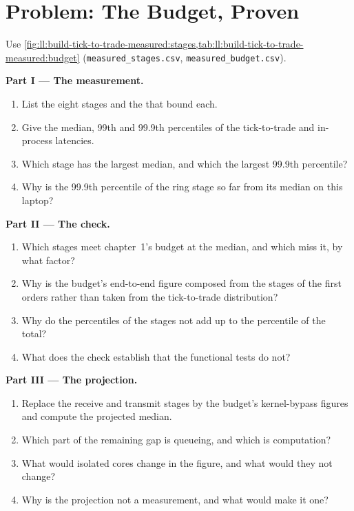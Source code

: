 \section{Problem: The Budget, Proven}

\begin{problem}\label{pb:ll:build-tick-to-trade-measured:1}
Use \cref{fig:ll:build-tick-to-trade-measured:stages,tab:ll:build-tick-to-trade-measured:budget} (\texttt{measured\_stages.csv},
\texttt{measured\_budget.csv}).

\medskip\noindent\textbf{Part I --- The measurement.}
\begin{enumerate}
\item List the eight stages and the  that bound each.
\item Give the median, 99th and 99.9th percentiles of the tick-to-trade and in-process latencies.
\item Which stage has the largest median, and which the largest 99.9th percentile?
\item Why is the 99.9th percentile of the ring stage so far from its median on this laptop?
\end{enumerate}

\medskip\noindent\textbf{Part II --- The check.}
\begin{enumerate}[resume]
\item Which stages meet chapter~1's budget at the median, and which miss it, by what factor?
\item Why is the budget's end-to-end figure composed from the stages of the first orders rather than taken from the
tick-to-trade distribution?
\item Why do the percentiles of the stages not add up to the percentile of the total?
\item What does the check establish that the functional tests do not?
\end{enumerate}

\medskip\noindent\textbf{Part III --- The projection.}
\begin{enumerate}[resume]
\item Replace the receive and transmit stages by the budget's kernel-bypass figures and compute the projected median.
\item Which part of the remaining gap is queueing, and which is computation?
\item What would isolated cores change in the figure, and what would they not change?
\item Why is the projection not a measurement, and what would make it one?
\end{enumerate}


\end{problem}

